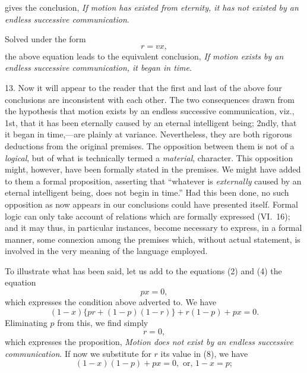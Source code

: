 \documentclass[oneside]{book}
\begin{document}
gives the conclusion, \emph{If motion has existed from eternity, it has not
existed by an endless successive communication}.

Solved under the form
\begin{equation*}
r = vx,
\end{equation*}
the above equation leads to the equivalent conclusion, \emph{If motion
exists by an endless successive communication, it began in time}.

13. Now it will appear to the reader that the first and last of
the above four conclusions are inconsistent with each other. The
two consequences drawn from the hypothesis that motion exists
by an endless successive communication, viz., 1st, that it has
been eternally caused by an eternal intelligent being; 2ndly, that
it began in time,---are plainly at variance. Nevertheless, they are
both rigorous deductions from the original premises. The opposition
between them is not of a \emph{logical}, but of what is technically
termed a \emph{material}, character. This opposition might, however,
have been formally stated in the premises. We might have
added to them a formal proposition, asserting that ``whatever is
\emph{externally} caused by an eternal intelligent being, does not begin in
time.'' Had this been done, no such opposition as now appears
in our conclusions could have presented itself. Formal logic
can only take account of relations which are formally expressed
(VI.~16); and it may thus, in particular instances, become necessary
to express, in a formal manner, some connexion among
the premises which, without actual statement, is involved in the
very meaning of the language employed.

To illustrate what has been said, let us add to the equations
(2) and (4) the equation
\begin{equation*}
px = 0,
\end{equation*}
which expresses the condition above adverted to. We have
\begin{equation*}
(1-x) \lbrace pr + (1-p)(1-r) \rbrace + r(1-p)+ px = 0.  \tag{8}
\end{equation*}
Eliminating $p$ from this, we find simply
\begin{equation*}
r = 0,
\end{equation*}
which expresses the proposition, \emph{Motion does not exist by an endless
successive communication}. If now we substitute for $r$ its value
in (8), we have
\begin{equation*}
(1-x)(1-p) +  px = 0,\text{ or, }1-x = p;
\end{equation*}
\end{document}
